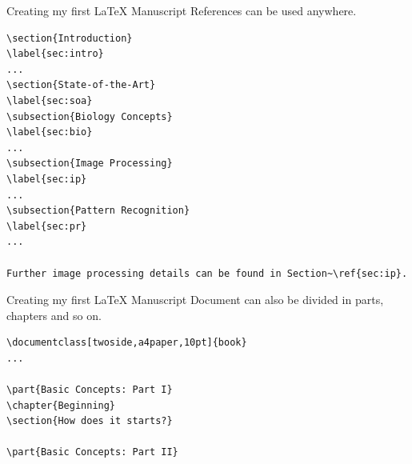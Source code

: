 \begin{frame}[fragile]{Creating my first \LaTeX{} Manuscript}
References can be used anywhere. 
\scriptsize
\begin{verbatim}
\section{Introduction}
\label{sec:intro}
...
\section{State-of-the-Art}
\label{sec:soa}
\subsection{Biology Concepts}
\label{sec:bio}
...
\subsection{Image Processing}
\label{sec:ip}
...
\subsection{Pattern Recognition}
\label{sec:pr}
...

Further image processing details can be found in Section~\ref{sec:ip}.
\end{verbatim}
\end{frame}

\begin{frame}[fragile]{Creating my first \LaTeX{} Manuscript}
Document can also be divided in parts, chapters and so on. 
\scriptsize
\begin{verbatim}
\documentclass[twoside,a4paper,10pt]{book}
...

\part{Basic Concepts: Part I}
\chapter{Beginning}
\section{How does it starts?}

\part{Basic Concepts: Part II}

\end{verbatim}
\end{frame}

